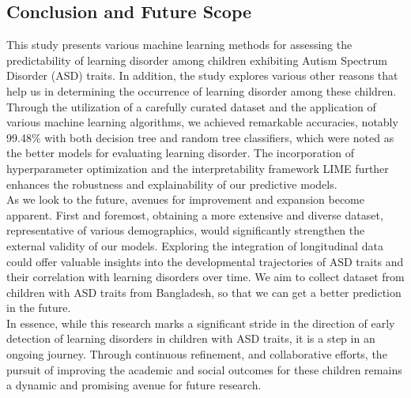 \documentclass{article}
\begin{document}
\begin{multicols}{2}
\section{Conclusion and Future Scope}
\hspace*{\parindent}This study presents various machine learning methods for assessing the predictability of learning disorder among children exhibiting Autism Spectrum Disorder (ASD) traits. In addition, the study explores various other reasons that help us in determining the occurrence of learning disorder among these children. Through the utilization of a carefully curated dataset and the application of various machine learning algorithms, we achieved remarkable accuracies, notably 99.48\% with both decision tree and random tree classifiers, which were noted as the better models for evaluating learning disorder. The incorporation of hyperparameter optimization and the interpretability framework LIME further enhances the robustness and explainability of our predictive models.\\
\hspace*{\parindent}As we look to the future, avenues for improvement and expansion become apparent. First and foremost, obtaining a more extensive and diverse dataset, representative of various demographics, would significantly strengthen the external validity of our models. Exploring the integration of longitudinal data could offer valuable insights into the developmental trajectories of ASD traits and their correlation with learning disorders over time. We aim to collect dataset from children with ASD traits from Bangladesh, so that we can get a better prediction in the future.\\
\hspace*{\parindent}In essence, while this research marks a significant stride in the direction of early detection of learning disorders in children with ASD traits, it is a step in an ongoing journey. Through continuous refinement, and collaborative efforts, the pursuit of improving the academic and social outcomes for these children remains a dynamic and promising avenue for future research.





\end{multicols}

\vspace{3\baselineskip}



\end{document}
